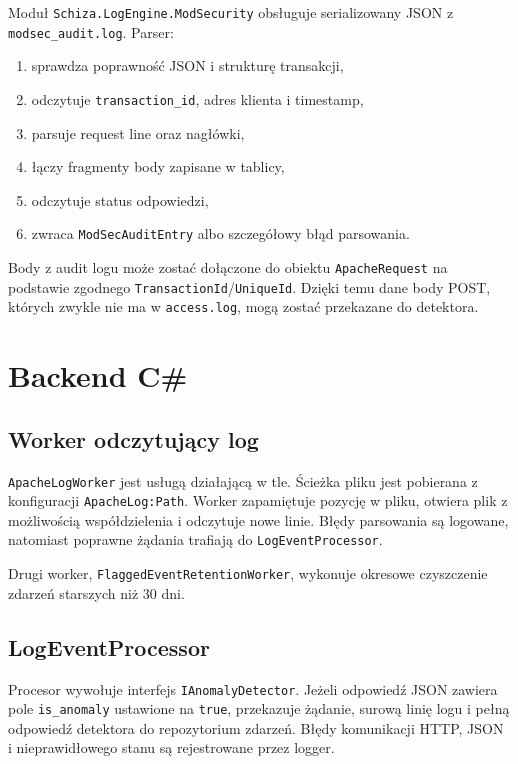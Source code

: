\documentclass[12pt,a4paper]{article}
\newcommand{\code}[1]{\texttt{#1}}
\begin{document}
Moduł \code{Schiza.LogEngine.ModSecurity} obsługuje serializowany JSON z
\code{modsec\_audit.log}. Parser:
\begin{enumerate}
    \item sprawdza poprawność JSON i strukturę transakcji,
    \item odczytuje \code{transaction\_id}, adres klienta i timestamp,
    \item parsuje request line oraz nagłówki,
    \item łączy fragmenty body zapisane w tablicy,
    \item odczytuje status odpowiedzi,
    \item zwraca \code{ModSecAuditEntry} albo szczegółowy błąd parsowania.
\end{enumerate}

Body z audit logu może zostać dołączone do obiektu \code{ApacheRequest} na
podstawie zgodnego \code{TransactionId}/\code{UniqueId}. Dzięki temu dane body
POST, których zwykle nie ma w \code{access.log}, mogą zostać przekazane do
detektora.

\section{Backend C\#}

\subsection{Worker odczytujący log}

\code{ApacheLogWorker} jest usługą działającą w tle. Ścieżka pliku jest pobierana
z konfiguracji \code{ApacheLog:Path}. Worker zapamiętuje pozycję w pliku, otwiera
plik z możliwością współdzielenia i odczytuje nowe linie. Błędy parsowania są
logowane, natomiast poprawne żądania trafiają do \code{LogEventProcessor}.

Drugi worker, \code{FlaggedEventRetentionWorker}, wykonuje okresowe czyszczenie
zdarzeń starszych niż 30 dni.

\subsection{LogEventProcessor}

Procesor wywołuje interfejs \code{IAnomalyDetector}. Jeżeli odpowiedź JSON zawiera
pole \code{is\_anomaly} ustawione na \code{true}, przekazuje żądanie, surową linię
logu i pełną odpowiedź detektora do repozytorium zdarzeń. Błędy komunikacji HTTP,
JSON i nieprawidłowego stanu są rejestrowane przez logger.
\end{document}
